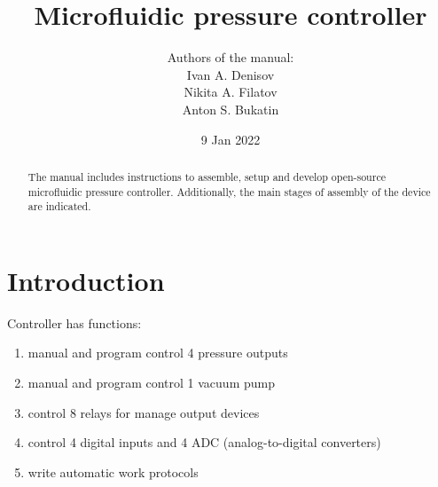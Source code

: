 \documentclass[twoside, 12pt, a4paper]{refart}
\title{Microfluidic pressure controller}
\author{
  Authors of the manual: \\
  Ivan A. Denisov \\
  Nikita A. Filatov \\
  Anton S. Bukatin \\
}
\date{9 Jan 2022}
\begin{document}
  \maketitle

  \begin{abstract}
    The manual includes instructions to assemble, setup and develop open-source microfluidic pressure controller. Additionally, the main stages of assembly of the device are indicated.
  \end{abstract}

  \tableofcontents

  \newpage



  \section{Introduction}
    \label{intro}
    

    Controller has functions:
    \begin{enumerate}
      \item manual and program control 4 pressure outputs   
      \item manual and program control 1 vacuum pump
      \item control 8 relays for manage output devices
      \item control 4 digital inputs and 4 ADC (analog-to-digital converters)
      \item write automatic work protocols
    \end{enumerate}
 
    
\end{document}
